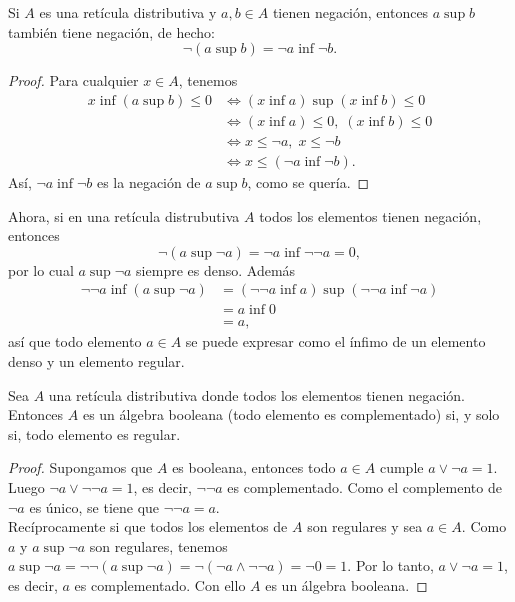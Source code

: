 \begin{proposition}
  Si $A$ es una retícula distributiva y $a,b\in A$ tienen
  negación, entonces $a\sup b$ también tiene negación, de hecho:
  \[
    \neg(a\sup b) = \neg a \inf \neg b
  .\]
\end{proposition}
\begin{proof}
  Para cualquier $x\in A$, tenemos
  \begin{align*}
    x\inf(a\sup b) \leq 0
    &\iff (x\inf a)\sup(x\inf b) \leq 0 \\
    &\iff (x\inf a)\leq 0, \; (x\inf b) \leq 0 \\
    &\iff x\leq\neg a, \; x\leq\neg b \\
    &\iff x\leq(\neg a \inf \neg b).
  \end{align*}
  Así, $\neg a\inf\neg b$ es la negación de $a\sup b$, como se
  quería.
\end{proof}

Ahora, si en una retícula distrubutiva $A$ todos los elementos
tienen negación, entonces
\[
  \neg(a\sup\neg a) = \neg a\inf\neg\neg a = 0
,\]
por lo cual $a\sup\neg a$ siempre es denso.
Además
\begin{align*}
  \neg\neg a\inf(a\sup\neg a)
  &= (\neg\neg a\inf a)\sup(\neg\neg a\inf\neg a) \\
  &= a \inf 0 \\
  &= a,
\end{align*}
así que todo elemento $a\in A$ se puede expresar como el ínfimo
de un elemento denso y un elemento regular.

\begin{lemma}
  Sea $A$ una retícula distributiva donde todos los elementos
  tienen negación.
  Entonces $A$ es un álgebra booleana (todo elemento es
  complementado) si, y solo si, todo elemento es regular.
\end{lemma}
\begin{proof}
     Supongamos que $A$ es booleana, entonces todo
    $a\in A$ cumple $a\vee \neg a=1$.
    Luego $\neg a\vee \neg\neg a=1$, es decir, $\neg\neg a$ es
    complementado.
    Como el complemento de $\neg a$ es único, se tiene que $\neg
    \neg a=a$. \\ 
    Recíprocamente si que todos los elementos de $A$ son
    regulares y sea $a\in A$.
    Como $a$ y $a\sup\neg a$ son regulares, tenemos
    $a\sup\neg a=\neg\neg (a\sup\neg a)=\neg(\neg
    a\wedge \neg\neg a)=\neg 0=1$.
    Por lo tanto, $a\vee \neg a=1$, es decir, $a$ es
    complementado. Con ello $A$ es un álgebra booleana.
\end{proof}


